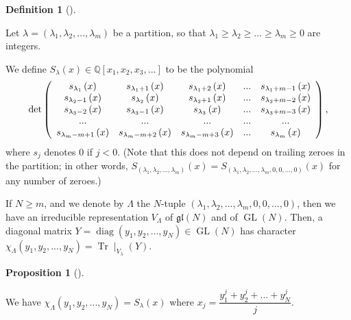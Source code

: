 \documentclass
[numbers=enddot,12pt,final,onecolumn,german,notitlepage]{scrartcl}%
\theoremstyle{definition}
\newtheorem{prop}[theo]{Proposition}
\newenvironment{proposition}[1][]
{\begin{prop}[#1]\begin{leftbar}}
{\end{leftbar}\end{prop}}
\newtheorem{defi}[theo]{Definition}
\newenvironment{definition}[1][]
{\begin{defi}[#1]\begin{leftbar}}
{\end{leftbar}\end{defi}}
\begin{document}
\begin{definition}
Let $\lambda=\left(  \lambda_{1},\lambda_{2},...,\lambda_{m}\right)  $ be a
partition, so that $\lambda_{1}\geq\lambda_{2}\geq...\geq\lambda_{m}\geq0$ are integers.

We define $S_{\lambda}\left(  x\right)  \in\mathbb{Q}\left[  x_{1},x_{2}%
,x_{3},...\right]  $ to be the polynomial%
\[
\det\left(
\begin{array}
[c]{ccccc}%
s_{\lambda_{1}}\left(  x\right)  & s_{\lambda_{1}+1}\left(  x\right)  &
s_{\lambda_{1}+2}\left(  x\right)  & ... & s_{\lambda_{1}+m-1}\left(  x\right)
\\
s_{\lambda_{2}-1}\left(  x\right)  & s_{\lambda_{2}}\left(  x\right)  &
s_{\lambda_{2}+1}\left(  x\right)  & ... & s_{\lambda_{2}+m-2}\left(  x\right)
\\
s_{\lambda_{3}-2}\left(  x\right)  & s_{\lambda_{3}-1}\left(  x\right)  &
s_{\lambda_{3}}\left(  x\right)  & ... & s_{\lambda_{3}+m-3}\left(  x\right)
\\
... & ... & ... & ... & ...\\
s_{\lambda_{m}-m+1}\left(  x\right)  & s_{\lambda_{m}-m+2}\left(  x\right)  &
s_{\lambda_{m}-m+3}\left(  x\right)  & ... & s_{\lambda_{m}}\left(  x\right)
\end{array}
\right)  ,
\]
where $s_{j}$ denotes $0$ if $j<0$. (Note that this does not depend on
trailing zeroes in the partition; in other words, $S_{\left(  \lambda
_{1},\lambda_{2},...,\lambda_{m}\right)  }\left(  x\right)  =S_{\left(
\lambda_{1},\lambda_{2},...,\lambda_{m},0,0,...,0\right)  }\left(  x\right)  $
for any number of zeroes.)

If $N\geq m$, and we denote by $\Lambda$ the $N$-tuple $\left(  \lambda
_{1},\lambda_{2},...,\lambda_{m},0,0,...,0\right)  $, then we have an
irreducible representation $V_{\Lambda}$ of $\mathfrak{gl}\left(  N\right)  $
and of $\operatorname*{GL}\left(  N\right)  $. Then, a diagonal matrix
$Y=\operatorname*{diag}\left(  y_{1},y_{2},...,y_{N}\right)  \in
\operatorname*{GL}\left(  N\right)  $ has character $\chi_{\Lambda}\left(
y_{1},y_{2},...,y_{N}\right)  =\operatorname*{Tr}\mid_{V_{\lambda}}\left(
Y\right)  $.
\end{definition}

\begin{proposition}
We have $\chi_{\Lambda}\left(  y_{1},y_{2},...,y_{N}\right)  =S_{\lambda
}\left(  x\right)  $ where $x_{j}=\dfrac{y_{1}^{j}+y_{2}^{j}+...+y_{N}^{j}}%
{j}$.
\end{proposition}
\end{document}
